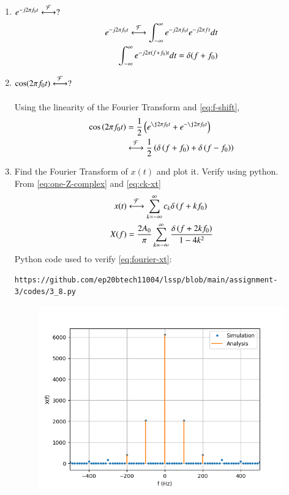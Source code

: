 \documentclass[journal,12pt,twocolumn]{IEEEtran}
\renewcommand\thesection{\arabic{section}}
\begin{document}
\begin{enumerate}[label=\thesection.\arabic*
		,ref=\thesection.\theenumi]
\begin{align}
			= e^{\j 2\pi (0) f} = 1
			\label{eq:fourier-delta}
		\end{align}
		\item $e^{-j2\pi f_0t}\overset{\mathcal{F}}{ \longleftrightarrow}?$\\
		\solution %
		\begin{align}
			e^{-j2\pi f_0t}\overset{\mathcal{F}}{ \longleftrightarrow} \int_{-\infty}^{\infty} e^{-j2\pi f_0t} e^{-j2\pi ft}dt\\
			\int_{-\infty}^{\infty} e^{-j2\pi (f+f_0)t} dt
			=\delta(f+f_0)
			\label{eq:f-shift}
		\end{align}
		\item $\cos(2\pi f_0t)\overset{\mathcal{F}}{ \longleftrightarrow}?$\\
		\solution\\
		Using the linearity of the Fourier Transform and \eqref{eq:f-shift},
		\begin{align}
			\cos\brak{2\pi f_0t} &= \frac{1}{2}
			\brak{e^{\j2\pi f_0t} + e^{-\j2\pi f_0t}} \nonumber \\ 
			&\system{F}\frac{1}{2}\brak{\delta\brak{f+f_0} + \delta\brak{f-f_0}}
		\end{align}
		\item Find the Fourier Transform of $x(t)$ and plot it.  Verify using python.\\
		\solution From \eqref{eq:one-Z-complex} and \eqref{eq:ck-xt}
		\begin{align}
			x(t)&\overset{\mathcal{F}}{ \longleftrightarrow}\sum_{k=-\infty}^{\infty}c_k\delta\left(f+kf_0\right) \\
			X(f)&=\frac{2A_0}{\pi}\sum_{k=-\infty}^{\infty}\frac{\delta\left(f+2kf_0\right)}{1-4k^2}
			\label{eq:fourier-xt}
		\end{align}
		Python code used to verify \eqref{eq:fourier-xt}:
		\begin{lstlisting}
https://github.com/ep20btech11004/lssp/blob/main/assignment-3/codes/3_8.py
		\end{lstlisting}
		\begin{figure}[!ht]
			\begin{center}
				\includegraphics[width=\columnwidth]{./figs/3_8.png}

\end{center}
\end{figure}
\end{enumerate}
\end{document}
